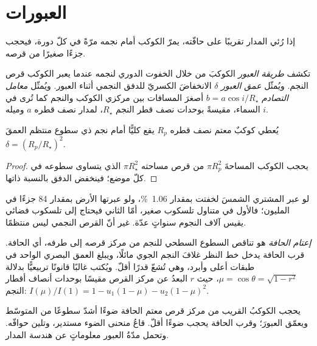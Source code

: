 \section{العبورات}\label{sec:b3:exoplanets:transits}

إذا رُئي المدار تقريبًا على حافّته،
يمرّ الكوكب أمام نجمه مرّةً في كلّ دورة، فيحجب جزءًا صغيرًا من قرصه.

\begin{definition}\label{def:b3:exoplanets:transit}
تكشف \emph{طريقة العبور} الكوكبَ من خلال
الخفوت الدوري لنجمه عندما يعبر الكوكب قرص النجم. ويُمثّل
\emph{عمق العبور} $\delta$ الانخفاضَ الكسريّ
للدفق النجمي أثناء العبور. ويُمثّل \emph{معامل
التصادم} $b = a\cos i/R_\star$ أصغرَ المسافات
بين مركزي الكوكب والنجم كما تُرى في السماء،
مقيسةً بوحدات نصف قطر النجم $R_\star$، لمدار نصف قطره $a$
وميله $i$.
\end{definition}

\begin{proposition}\label{prop:b3:exoplanets:depth}
يُعطي كوكبٌ معتم نصف قطره $R_p$ يقع كليًّا أمام نجم ذي سطوع منتظم
العمقَ $\delta = (R_p/R_\star)^2$.
\end{proposition}

\begin{proof}
يحجب الكوكب المساحةَ $\pi R_p^2$ من قرص مساحته $\pi R_\star^2$
الذي يتساوى سطوعه في كلّ موضع؛ فينخفض الدفق بالنسبة ذاتها.
\end{proof}

لو عبر المشتري الشمسَ لخفتت بمقدار \qty{1.06}{\percent}، ولو عبرتها الأرض
بمقدار \num{84} جزءًا في المليون؛ فالأول في متناول
تلسكوب صغير، أمّا الثاني فيحتاج إلى تلسكوب فضائي يقيس آلاف
النجوم سنواتٍ عدّة. غير أنّ القرص النجمي ليس منتظمًا.

\begin{definition}\label{def:b3:exoplanets:limb}
\emph{إعتام الحافة} هو تناقص السطوع السطحي
للنجم من مركز قرصه إلى طرفه، أي الحافة.
قرب الحافة يدخل خط النظر غلافَ النجم الجوي مائلًا،
ويبلغ العمق البصري الواحد في طبقات أعلى وأبرد، وهي تُشعّ
قدرًا أقلّ. ويُكتب غالبًا قانونًا تربيعيًّا بدلالة $\mu = \cos\theta =
\sqrt{1 - r^2}$، حيث $r$ البعدُ عن مركز القرص مقيسًا
بوحدات أنصاف أقطار النجم: $I(\mu)/I(1) = 1 - u_1(1 - \mu) - u_2(1 - \mu)^2$.
\end{definition}

يحجب الكوكبُ القريب من مركز قرص معتم الحافة ضوءًا أشدّ سطوعًا
من المتوسّط ويعمّق العبورَ؛ وقرب الحافة يحجب ضوءًا أقلّ.
قاعُ منحنى الضوء مستدير، وتلين حوافّه. وتحمل مدّةُ
العبور معلوماتٍ عن هندسة المدار.

